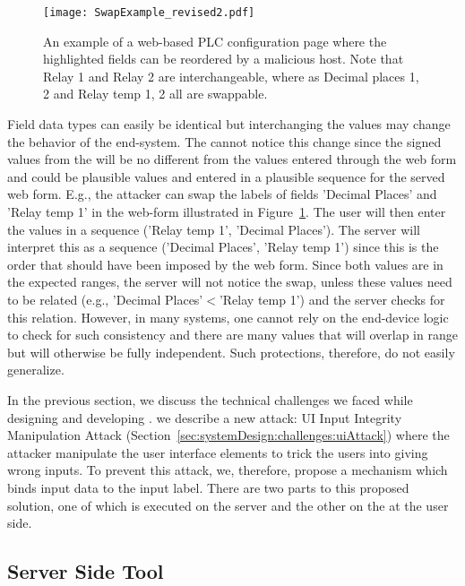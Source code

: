 \begin{figure}[t]
  \centering
    \texttt{[image: SwapExample\_revised2.pdf]}
    \caption{An example of a web-based PLC configuration page where the highlighted fields can be reordered by a malicious host. Note that Relay 1 and Relay 2 are interchangeable, where as Decimal places 1, 2 and Relay temp 1, 2 all are swappable.}
    \label{fig:swapExample} 
\end{figure}


 Field data types can easily be identical but interchanging the values may change the behavior of the end-system. The \server cannot notice this change since the signed values from the \device will be no different from the values entered through the web form and could be plausible values and entered in a plausible sequence for the served web form. E.g., the attacker can swap the labels of fields 'Decimal Places' and 'Relay temp 1' in the web-form illustrated in Figure~\ref{fig:swapExample}. The user will then enter the values in a sequence ('Relay temp 1', 'Decimal Places'). The server will interpret this as a sequence ('Decimal Places', 'Relay temp 1') since this is the order that should have been imposed by the web form. Since both values are in the expected ranges, the server will not notice the swap, unless these values need to be related (e.g., 'Decimal Places'$<$'Relay temp 1') and the server checks for this relation. However, in many systems, one cannot rely on the end-device logic to check for such consistency and there are many values that will overlap in range but will otherwise be fully independent. Such protections, therefore, do not easily generalize.

\fi

In the previous section, we discuss the technical challenges we faced while designing and developing \tool.  we describe a new attack: UI Input Integrity Manipulation Attack (Section~\ref{sec:systemDesign:challenges:uiAttack}) where the attacker manipulate the user interface elements to trick the users into giving wrong inputs. To prevent this attack, we, therefore, propose a mechanism which binds input data to the input label. There are two parts to this proposed solution, one of which is executed on the server and the other on the \device at the user side.

\subsection{\tool Server Side Tool}
\label{sec:fieldSwap:serverSide}

